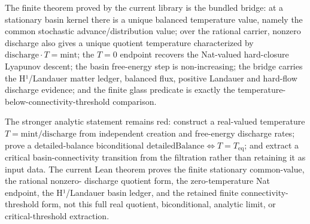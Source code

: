 \begin{theorem}\label{thm:temperature-bridge-glass-rung}\leanok{}
The finite theorem proved by the current library is the bundled bridge: at a
stationary basin kernel there is a unique balanced temperature value, namely the
common stochastic advance/distribution value; over the rational carrier,
nonzero discharge also gives a unique quotient temperature characterized by
\(\mathrm{discharge}\cdot T=\mathrm{mint}\); the \(T=0\) endpoint recovers the
Nat-valued hard-closure Lyapunov descent; the basin free-energy step is
non-increasing; the bridge carries the H¹/Landauer matter ledger, balanced flux,
positive Landauer and hard-flow discharge evidence; and the finite glass
predicate is exactly the temperature-below-connectivity-threshold comparison.
\end{theorem}

\begin{theorem}\label{thm:real-ratio-temperature-connectivity-frontier}\notready{}
The stronger analytic statement remains red: construct a real-valued
temperature \(T=\mathrm{mint}/\mathrm{discharge}\) from independent creation and
free-energy discharge rates; prove a detailed-balance biconditional
\(\mathrm{detailedBalance}\iff T=T_{\mathrm{eq}}\); and extract a critical
basin-connectivity transition from the filtration rather than retaining it as
input data.  The current Lean
theorem proves the finite stationary common-value, the rational nonzero-
discharge quotient form, the zero-temperature Nat endpoint, the H¹/Landauer
basin ledger, and the retained finite connectivity-threshold form, not this
full real quotient, biconditional, analytic limit, or critical-threshold
extraction.
\end{theorem}
